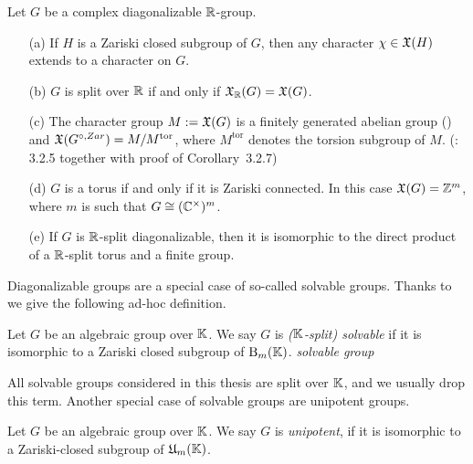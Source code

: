 \begin{prop}\label{prop:Characters}
	Let $G$ be a complex diagonalizable $\mathbb R$-group.
	\begin{itemize}\itemsep 1pt
		\item[(a)] If $H$ is a Zariski closed subgroup of $G$, then any character $\chi \in \mathfrak{X}(H)$ extends to a character on $G$. \cite[Proposition~8.2(c)]{BorelBook}
		
		\item[(b)] $G$ is split over $\mathbb R$ if and only if $\mathfrak{X}_\mathbb R(G) = \mathfrak{X}(G)$. \cite[Corollary~8.2]{BorelBook}
		
		\item [(c)] The character group $M := \mathfrak{X}(G)$ is a finitely generated abelian group (\cite[Corollary~3.2.4]{SpringerBook}) and $\mathfrak{X}(G^{\circ,Zar}) = M/M^{\mathrm{tor}}$, where $M^{\mathrm{tor}}$ denotes the torsion subgroup of $M$. (\cite{SpringerBook}: 3.2.5 together with proof of Corollary~3.2.7)
		
		\item[(d)] $G$ is a torus if and only if it is Zariski connected. In this case $\mathfrak{X}(G) = \mathbb Z^m$, where $m$ is such that $G \cong (\mathbb C^\times)^m$. \cite[Proposition~8.5]{BorelBook}
		
		\item[(e)] If $G$ is $\mathbb R$-split diagonalizable, then it is isomorphic to the direct product of a $\mathbb R$-split torus and a finite group. \cite[Proposition~8.7]{BorelBook}
	\end{itemize}
\end{prop}

Diagonalizable groups are a special case of so-called solvable groups. Thanks to \cite[Theorem~15.4]{BorelBook} we give the following ad-hoc definition.

\begin{defn} \label{defn:SolvableGroup}
	Let $G$ be an algebraic group over $\mathbb K$. We say $G$ is \emph{($\mathbb K$-split) solvable} if it is isomorphic to a Zariski closed subgroup of $\operatorname{B}_m(\mathbb K)$.
	\emph{solvable group}
	\hfill{}
\end{defn}

All solvable groups considered in this thesis are split over $\mathbb K$, and we usually drop this term.
Another special case of solvable groups are unipotent groups.

\begin{defn}\label{defn:UnipotentGroup}
	Let $G$ be an algebraic group over $\mathbb K$. We say $G$ is \emph{unipotent}, if it is isomorphic to a Zariski-closed subgroup of $\mathfrak{U}_m(\mathbb K)$.
	\hfill{}
\end{defn}

